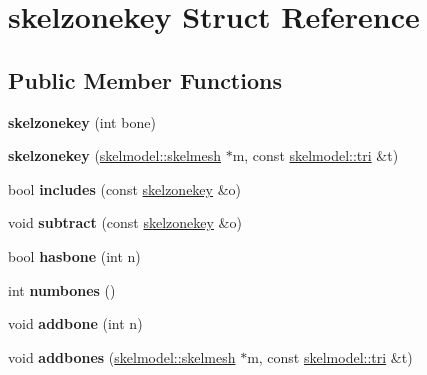 \hypertarget{structskelzonekey}{}\section{skelzonekey Struct Reference}
\label{structskelzonekey}
\subsection*{Public Member Functions}
\begin{DoxyCompactItemize}
\item 
\mbox{\label{structskelzonekey_a1ca4b99327da4af2ba5adf9a0a522463}} 
{\bfseries skelzonekey} (int bone)
\item 
\mbox{\label{structskelzonekey_a9a4d65a7b29f1813df0cab98e09be05a}} 
{\bfseries skelzonekey} (\hyperlink{structskelmodel_1_1skelmesh}{skelmodel\+::skelmesh} $\ast$m, const \hyperlink{structskelmodel_1_1tri}{skelmodel\+::tri} \&t)
\item 
\mbox{\label{structskelzonekey_a66f77875797eb85067e36ec29271a26b}} 
bool {\bfseries includes} (const \hyperlink{structskelzonekey}{skelzonekey} \&o)
\item 
\mbox{\label{structskelzonekey_a66bed577cbeb69f3aaeb6e1b3d3e0d5b}} 
void {\bfseries subtract} (const \hyperlink{structskelzonekey}{skelzonekey} \&o)
\item 
\mbox{\label{structskelzonekey_a6ab7d6cae671af170718f7d4602dd02c}} 
bool {\bfseries hasbone} (int n)
\item 
\mbox{\label{structskelzonekey_aec9f8f3d24fb8814736bd790baee0eef}} 
int {\bfseries numbones} ()
\item 
\mbox{\label{structskelzonekey_aa5a9e087f767639e774d2d3e6499de0b}} 
void {\bfseries addbone} (int n)
\item 
\mbox{\label{structskelzonekey_a9135efdfe9adc5f0cfb57d0a2d9e4267}} 
void {\bfseries addbones} (\hyperlink{structskelmodel_1_1skelmesh}{skelmodel\+::skelmesh} $\ast$m, const \hyperlink{structskelmodel_1_1tri}{skelmodel\+::tri} \&t)
\end{DoxyCompactItemize}
